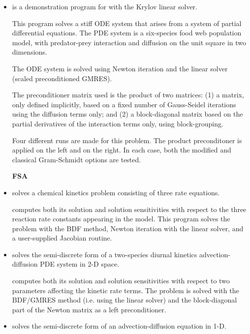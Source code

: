 \begin{itemize}
\item {}
  is a demonstration program for {\cvode} with the Krylov linear solver.

  This program solves a stiff ODE system that arises from a system     
  of partial differential equations.  The PDE system is a six-species
  food web population model, with predator-prey interaction and diffusion 
  on the unit square in two dimensions.

  The ODE system is solved using Newton iteration and the      
  {\cvspgmr} linear solver (scaled preconditioned GMRES).

  The preconditioner matrix used is the product of two matrices:         
  (1) a matrix, only defined implicitly, based on a fixed number of     
  Gauss-Seidel iterations using the diffusion terms only; and               
  (2) a block-diagonal matrix based on the partial derivatives of the   
  interaction terms only, using block-grouping.                          

  Four different runs are made for this problem.                        
  The product preconditoner is applied on the left and on the right.    
  In each case, both the modified and classical Gram-Schmidt options    
  are tested.

\item[{\bf FSA}]

\item {}
  solves a chemical kinetics problem consisting of three rate equations.

  {\cvodes} computes both its solution and solution sensitivities with respect
  to the three reaction rate constants appearing in the model. 
  This program solves the problem with the BDF method, Newton          
  iteration with the {\cvdense} linear solver, and a user-supplied    
  Jacobian routine.

\item {}
  solves the semi-discrete form of a two-species diurnal kinetics
  advection-diffusion PDE system in 2-D space.

  {\cvodes} computes both its solution and solution sensitivities with respect
  to two parameters affecting the kinetic rate terms.
  The problem is solved with the BDF/GMRES method (i.e.    
  using the {\cvspgmr} linear solver) and the block-diagonal part of the  
  Newton matrix as a left preconditioner.

\item {}
  solves the semi-discrete form of an advection-diffusion equation in 1-D.


\end{itemize}
